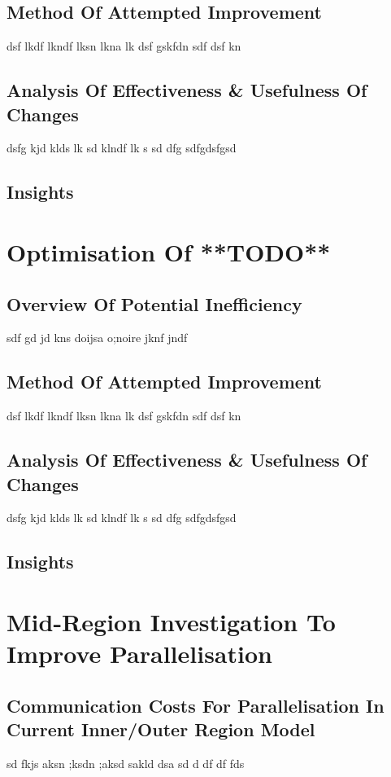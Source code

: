 \subsection{Method Of Attempted Improvement}
dsf lkdf lkndf lksn lkna lk
dsf gskfdn sdf 
dsf kn

\subsection{Analysis Of Effectiveness \& Usefulness Of Changes}
dsfg kjd klds lk
sd klndf lk s
sd dfg sdfgdsfgsd

\subsection{Insights}

\section{Optimisation Of **TODO**}
\subsection{Overview Of Potential Inefficiency}
sdf gd jd kns doijsa o;noire jknf jndf 

\subsection{Method Of Attempted Improvement}
dsf lkdf lkndf lksn lkna lk
dsf gskfdn sdf 
dsf kn

\subsection{Analysis Of Effectiveness \& Usefulness Of Changes}
dsfg kjd klds lk
sd klndf lk s
sd dfg sdfgdsfgsd

\subsection{Insights}

\section{Mid-Region Investigation To Improve Parallelisation}
\subsection{Communication Costs For Parallelisation In Current Inner/Outer Region Model}
sd fkjs aksn ;ksdn ;aksd sakld dsa 
sd d df 
df fds 
